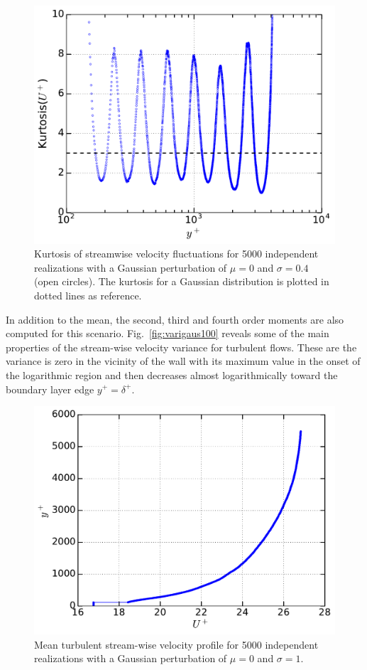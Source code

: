 \documentclass[aps,reprint,amsmath,amssymb,pra]{revtex4-1}%
\begin{document}
\begin{figure}[tb]
\includegraphics[scale=0.46]{figures/kurtosis_5000_assembles}
\caption{\label{fig:kurt} Kurtosis of streamwise velocity fluctuations for 5000 independent realizations with a Gaussian perturbation of $\mu=0$ and $\sigma=0.4$ (open circles). The kurtosis for a Gaussian distribution is plotted in dotted lines as reference.}
\end{figure}
In addition to the mean, the second, third and fourth order moments are also computed for this scenario. Fig.~\ref{fig:varigaus100} reveals some of the main properties of the stream-wise velocity variance for turbulent flows.  These are the variance is zero in the vicinity of the wall with its maximum value in the onset of the logarithmic region and then decreases almost logarithmically toward the boundary layer edge $y^+=\delta^+$. 
\begin{figure}[tb]
\includegraphics[scale=0.45]{figures/Master_averaged_step_profile_5000_assembles_gauss100}
\caption{\label{fig:mp_gau100} Mean turbulent stream-wise velocity profile for 5000 independent realizations with a Gaussian perturbation of $\mu=0$ and $\sigma=1$.}
\end{figure}
\end{document}
